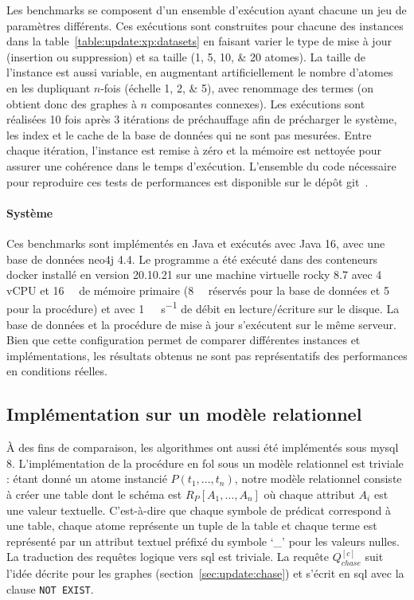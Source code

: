 Les benchmarks se composent d'un ensemble d'exécution ayant chacune un jeu de paramètres différents.
Ces exécutions sont construites pour chacune des instances dans la table~\ref{table:update:xp:datasets} en faisant varier le type de mise à jour (insertion ou suppression) et sa taille (\numlist{1;5;10;20} atomes).
La taille de l'instance est aussi variable, en augmentant artificiellement le nombre d'atomes en les dupliquant $n$-fois (échelle \numlist{1;2;5}), avec renommage des termes (on obtient donc des graphes à $n$ composantes connexes).
Les exécutions sont réalisées \num{10} fois après \num{3} itérations de préchauffage afin de précharger le système, les index et le cache de la base de données qui ne sont pas mesurées.
Entre chaque itération, l'instance est remise à zéro et la mémoire est nettoyée pour assurer une cohérence dans le temps d'exécution.
L'ensemble du code nécessaire pour reproduire ces tests de performances est disponible sur le dépôt \gls{git}~\cite{chabinUpdateChase2023}.

\paragraph{Système}
Ces benchmarks sont implémentés en Java et exécutés avec {Java 16}, avec une base de données \gls{neo4j} 4.4.
Le programme a été exécuté dans des conteneurs \gls{docker} installé en version 20.10.21 sur une machine virtuelle \gls{rocky} 8.7 avec \num{4} vCPU et \SI{16}{\giga\byte} de mémoire primaire (\SI{8}{\giga\byte} réservés pour la base de données et \SI{5}{\giga\byte} pour la procédure) et avec \SI{1}{\giga\byte\per\second} de débit en lecture/écriture sur le disque.
La base de données et la procédure de mise à jour s'exécutent sur le même serveur.
Bien que cette configuration permet de comparer différentes instances et implémentations, les résultats obtenus ne sont pas représentatifs des performances en conditions réelles.

\subsection{Implémentation sur un modèle relationnel}
\label{sec:update:evaluation:mysql}
À des fins de comparaison, les algorithmes ont aussi été implémentés sous \gls{mysql} 8.
L'implémentation de la procédure en \gls{fol} sous un modèle relationnel est triviale : étant donné un atome instancié $P(t_1, \dots, t_n)$, notre modèle relationnel consiste à créer une table dont le schéma est $R_P[A_1, \dots, A_n]$ où chaque attribut $A_i$ est une valeur textuelle.
C'est-à-dire que chaque symbole de prédicat correspond à une table, chaque atome représente un tuple de la table et chaque terme est représenté par un attribut textuel préfixé du symbole `\_' pour les valeurs nulles.
La traduction des requêtes logique vers \gls{sql} est triviale.
La requête $Q_{chase}^{[c]}$ suit l'idée décrite pour les graphes (section~\ref{sec:update:chase}) et s'écrit en \gls{sql} avec la clause \verb|NOT EXIST|.

